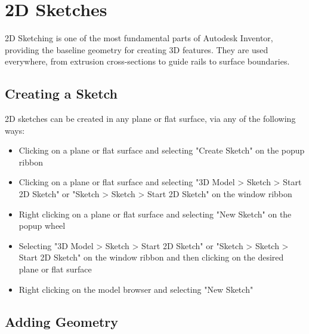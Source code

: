 \section{2D Sketches}

2D Sketching is one of the most fundamental parts of Autodesk Inventor, providing the baseline geometry for creating 3D features. They are used everywhere, from extrusion cross-sections to guide rails to surface boundaries.

\subsection{Creating a Sketch}

2D sketches can be created in any plane or flat surface, via any of the following ways:

\begin{itemize}
\item Clicking on a plane or flat surface and selecting "Create Sketch" on the popup ribbon
\item Clicking on a plane or flat surface and selecting "3D Model > Sketch > Start 2D Sketch" or "Sketch > Sketch > Start 2D Sketch" on the window ribbon
\item Right clicking on a plane or flat surface and selecting "New Sketch" on the popup wheel
\item Selecting "3D Model > Sketch > Start 2D Sketch" or "Sketch > Sketch > Start 2D Sketch" on the window ribbon and then clicking on the desired plane or flat surface
\item Right clicking on the model browser and selecting "New Sketch"
\end{itemize}

\subsection{Adding Geometry}

$ $

